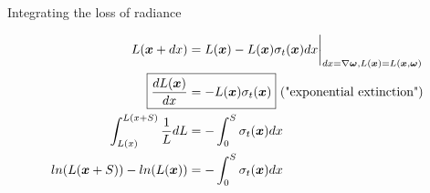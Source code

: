 \documentclass[
  english,            %
  aspectratio=169,    %
]{tumbeamer}
\newcommand\bx[0]{\bm{x}}
\newcommand\bomega[0]{\bm{\omega}}
\begin{document}
\begin{frame}{Integrating the loss of radiance}
\begin{figure}[ht]
    \centering
    \scalebox{.6}{
        
    }
    \begin{align}
    \begin{aligned}
        L(\bx + dx) &= 
            L(\bx) - L(\bx)\sigma_t(\bx)dx\bigg|_{dx=\nabla\bomega,
            L(\bx)=L(\bx, \bomega)} \\
        \Aboxed{\frac{dL(\bx)}{dx} &=
        -L(\bx)\sigma_t(\bx)} \text{ ("exponential extinction")}\\
        \int_{L(x)}^{L(x+S)} \frac{1}{L} dL &= -\int_0^S \sigma_t(\bx)dx\\
        ln(L(\bx+S)) - ln(L(\bx)) &= - \int_0^S \sigma_t(\bx) dx
    \end{aligned}
    \end{align}

\end{figure}
\end{frame}
\end{document}
